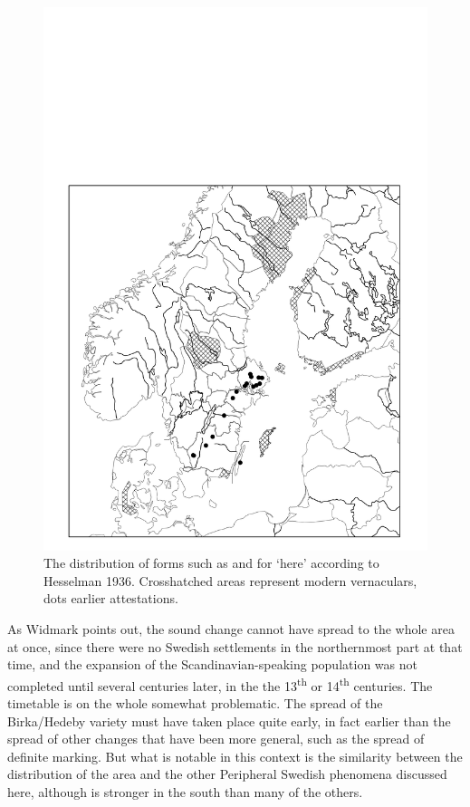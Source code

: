 \begin{figure}[h]
 

\includegraphics[height=.5\textheight]{figures/30_DistributionHjärJär}
\caption{The distribution of forms such as  and  for ‘here’ according to Hesselman 1936. Crosshatched areas represent modern vernaculars, dots earlier attestations.}
\label{map:26}
\end{figure}

As Widmark points out, the sound change  cannot have spread to the whole area at once, since there were no Swedish settlements in the northernmost part at that time, and the expansion of the Scandinavian-speaking population was not completed until several centuries later, in the the 13\textsuperscript{th} or 14\textsuperscript{th} centuries. The timetable is on the whole somewhat problematic. The spread of the Birka/Hedeby variety must have taken place quite early, in fact earlier than the spread of other changes that have been more general, such as the spread of definite marking. But what is notable in this context is the similarity between the distribution of the area and the other Peripheral Swedish phenomena discussed here, although  is stronger in the south than many of the others. 

